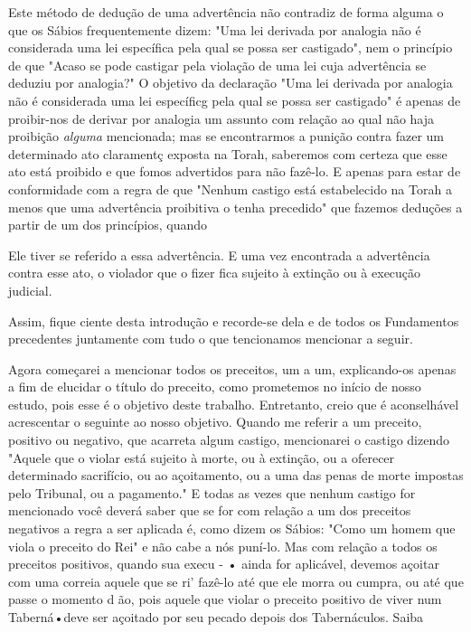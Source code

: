 Este método de dedução de uma advertência não contradiz de for­ma alguma
o que os Sábios frequentemente dizem: "Uma lei derivada por ana­logia
não é considerada uma lei específica pela qual se possa ser castigado",
nem o princípio de que "Acaso se pode castigar pela violação de uma lei
cuja advertência se deduziu por analogia?" O objetivo da declaração "Uma
lei deri­vada por analogia não é considerada uma lei específicg pela
qual se possa ser castigado" é apenas de proibir-nos de derivar por
analogia um assunto com re­lação ao qual não haja proibição
\emph{alguma} mencionada; mas se encontrarmos a punição contra fazer um
determinado ato claramentç exposta na Torah, sabe­remos com certeza que
esse ato está proibido e que fomos advertidos para não fazê-lo. E apenas
para estar de conformidade com a regra de que "Nenhum cas­tigo está
estabelecido na Torah a menos que uma advertência proibitiva o te­nha
precedido" que fazemos deduções a partir de um dos princípios, quando


Ele tiver se referido a essa advertência. E uma vez encontrada a
advertência contra
esse ato, o violador que o fizer fica sujeito à extinção ou à
execução judicial.


Assim, fique ciente desta introdução e recorde-se dela e de todos os
Fundamentos precedentes juntamente com tudo o que tencionamos mencio­nar
a seguir.

Agora começarei a mencionar todos os preceitos, um a um, expli­cando-os
apenas a fim de elucidar o título do preceito, como prometemos no início
de nosso estudo, pois esse é o objetivo deste trabalho. Entretanto,
creio que é aconselhável acrescentar o seguinte ao nosso objetivo.
Quando me refe­rir a um preceito, positivo ou negativo, que acarreta
algum castigo, menciona­rei o castigo dizendo "Aquele que o violar está
sujeito à morte, ou à extinção, ou a oferecer determinado sacrifício, ou
ao açoitamento, ou a uma das penas de morte impostas pelo Tribunal, ou a
pagamento." E todas as vezes que ne­nhum castigo for mencionado você
deverá saber que se for com relação a um dos preceitos negativos a regra
a ser aplicada é, como dizem os Sábios: "Como um homem que viola o
preceito do Rei" e não cabe a nós puní-lo. Mas com relação a todos os
preceitos positivos, quando sua execu - • ainda for aplicável, 
devemos açoitar com uma correia aquele que se ri' fazê-lo até que
ele morra ou cumpra, ou até que passe o momento d ão, pois aquele
que violar o preceito positivo de viver num Taberná•deve ser açoi­tado
por seu pecado depois dos Tabernáculos. Saiba

